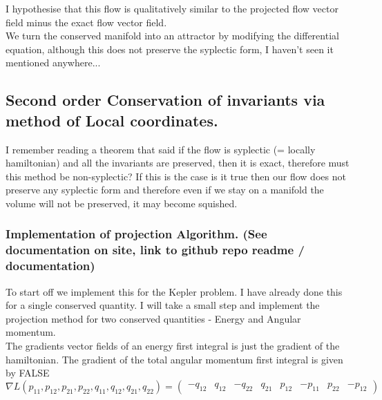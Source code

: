 \documentclass[12pt]{article}
\begin{document}
I hypothesise that this flow is qualitatively similar to the projected flow vector field minus the exact flow vector field.\\ 

We turn the conserved manifold into an attractor by modifying the differential equation, although this does not preserve the syplectic form, I haven't seen it mentioned anywhere...

\subsection{Second order Conservation of invariants via method of Local coordinates.}

I remember reading a theorem that said if the flow is syplectic (= locally hamiltonian) and all the invariants are preserved, then it is exact, therefore must this method be non-syplectic? If this is the case is it true then our flow does not preserve any syplectic form and therefore even if we stay on a manifold the volume will not be preserved, it may become squished. 


\subsubsection{Implementation of projection Algorithm. (See documentation on site, link to github repo readme / documentation)}

To start off we implement this for the Kepler problem. I have already done this for a single conserved quantity. I will take a small step and implement the projection method for two conserved quantities - Energy and Angular momentum. \\

The gradients vector fields of an energy first integral is just the gradient of the hamiltonian. The gradient of the total angular momentum first integral is given by 
FALSE
\begin{equation}\label{eq:first integral gradient total angular momentum}
    \nabla L(p_{11},p_{12},p_{21},p_{22},q_{11},q_{12},q_{21},q_{22}) = \begin{pmatrix} -q_{12} & q_{12} & -q_{22} & q_{21} & p_{12} & -p_{11} & p_{22} & -p_{12} \end{pmatrix}
\end{equation}


\\ 
\end{document}
